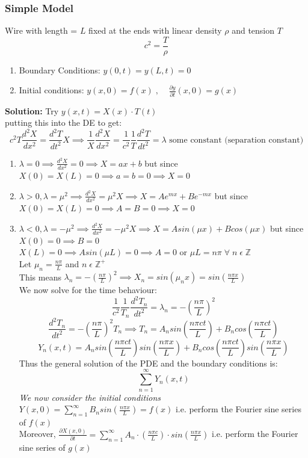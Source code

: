 \documentclass[11pt]{article}
\theoremstyle{definition}
\newcommand{\Z}{\mathbb{Z}}
\newcommand{\pd}{{\partial}}
\newcommand*{\dt}[2]{\frac{d^2{#1}}{d{#2}^2}}
\newcommand*{\pdo}[2]{\frac{\pd{#1}}{\pd{#2}}}%
\begin{document}
\subsubsection{Simple Model}
Wire with length = $L$ fixed at the ends with linear density $\rho$ and tension $T$
$$c^2 = \frac{T}{\rho}$$
\begin{enumerate}
    \item Boundary Conditions: $y(0,t) = y(L,t) = 0$
    \item Initial conditions: $y(x,0) = f(x)\;,\;\;\;\; \pdo{y}{t} (x,0) = g(x)$
\end{enumerate}
\textbf{Solution:} Try $y(x,t) = X(x)\cdot T(t)$\\
putting this into the DE to get:
$$c^2T\dt{X}{x} = \dt{T}{t} X \implies \frac{1}{X}\dt{X}{x} = \frac{1}{c^2} \frac{1}{T}\dt{T}{t} = \lambda \text{   some constant (separation constant)}$$
\begin{enumerate}
    \item $\lambda = 0 \implies \dt{X}{x} = 0 \implies X = ax + b$ but since $X(0) = X(L) = 0 \implies a = b = 0 \implies X = 0$ 
    \item $\lambda > 0, \lambda = \mu^2 \implies \dt{X}{x} = \mu^2 X \implies X = Ae^{mx} + Be^{-mx}$ but since $X(0) = X(L) = 0 \implies A = B = 0 \implies X = 0$
    \item  $\lambda < 0, \lambda = -\mu^2 \implies \dt{X}{x} = -\mu^2 X \implies X = Asin(\mu x) + Bcos(\mu x)$ but since $X(0) = 0 \implies B = 0 $ $X(L) = 0 \implies Asin(\mu L) = 0 \implies  A = 0 \text{ or } \mu L = n \pi \; \forall\; n \; \epsilon\; \Z$\\
    Let $\mu_n = \frac{n\pi}{L}$ and $n\; \epsilon\; \Z^+$\\
    This means $\lambda_n = -(\frac{n\pi}{L})^2 \implies X_n = sin(\mu_n x) = sin(\frac{n\pi x}{L})$\\
    We now solve for the time behaviour:\\
    $$\frac{1}{c^2} \frac{1}{T_n}\dt{T_n}{t} = \lambda_n = -(\frac{n\pi}{L})^2$$
    $$ \dt{T_n}{t} = -(\frac{n\pi}{L})^2T_n \implies T_n = A_n sin(\frac{n\pi c t}{L}) + B_n cos(\frac{n\pi c t}{L})$$
    $$Y_n(x,t) = A_n sin(\frac{n\pi c t}{L})sin(\frac{n\pi x}{L}) + B_n cos(\frac{n\pi c t}{L})sin(\frac{n\pi x}{L}) $$
    Thus the general solution of the PDE and the boundary conditions is:
    $$\sum_{n=1}^\infty Y_n(x,t)$$
    \textit{We now consider the initial conditions\\} $Y(x,0) = \sum_{n=1}^\infty B_n sin(\frac{n\pi x}{L}) = f(x)$ i.e. perform the Fourier sine series of $f(x)$\\
    Moreover, 
    $\pdo{X(x,0)}{t} = \sum_{n=1}^\infty A_n\cdot (\frac{n \pi c}{L})\cdot sin(\frac{n\pi x}{L})$  i.e. perform the Fourier sine series of $g(x)$\\
\end{enumerate}
\end{document}
